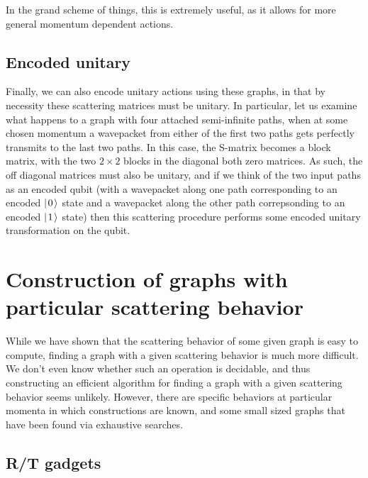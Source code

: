 \documentclass[../thesis-main/thesis-main]{subfiles}
\begin{document}
In the grand scheme of things, this is extremely useful, as it allows for more general momentum dependent actions.


\subsection{Encoded unitary}

Finally, we can also encode unitary actions using these graphs, in that by necessity these scattering matrices must be unitary.  In particular, let us examine what happens to a graph with four attached semi-infinite paths, when at some chosen momentum a wavepacket from either of the first two paths gets perfectly transmits to the last two paths.  In this case, the S-matrix becomes a block matrix, with the two $2\times 2$ blocks in the diagonal both zero matrices.  As such, the off diagonal matrices must also be unitary, and if we think of the two input paths as an encoded qubit (with a wavepacket along one path corresponding to an encoded $|\mspace{2mu} 0 \mspace{2mu} \rangle$ state and a wavepacket along the other path correpsonding to an encoded $|\mspace{2mu} 1 \mspace{2mu} \rangle$ state) then this scattering procedure performs some encoded unitary transformation on the qubit.



\section{Construction of graphs with particular scattering behavior}

While we have shown that the scattering behavior of some given graph is easy to compute, finding a graph with a given scattering behavior is much more difficult.  We don't even know whether such an operation is decidable, and thus constructing an efficient algorithm for finding a graph with a given scattering behavior seems unlikely.  However, there are specific behaviors at particular momenta in which constructions are known, and some small sized graphs that have been found via exhaustive searches.



\subsection{R/T gadgets}
\end{document}
